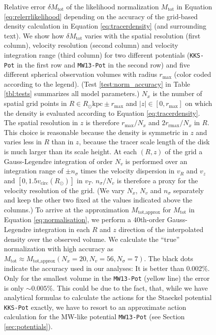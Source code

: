 

\begin{figure}
\centering
{}
\caption{Relative error  $\delta M_\text{tot}$ of the likelihood normalization $M_\text{tot}$ in Equation \ref{eq:relerrlikelihood} depending on the accuracy of the grid-based density calculation in Equation \ref{eq:tracerdensity} (and surrounding text). We show how $\delta M_\text{tot}$ varies with the spatial resolution (first column), velocity resolution (second column) and velocity integration range (third column) for two different potentials (\texttt{KKS-Pot} in the first row and \texttt{MW13-Pot} in the second row) and five different spherical observation volumes with radius $r_\text{max}$ (color coded according to the legend). (Test \ref{test:norm_accuracy} in Table \ref{tbl:tests} summarizes all model parameters.) $N_x$ is the number of spatial grid points in $R \in R_\odot \text{kpc} \pm r_\text{max}$ and $|z| \in [0,r_\text{max}]$ on which the density is evaluated according to Equation \ref{eq:tracerdensity}. The spatial resolution in $z$ is therefore $r_\text{max}/N_x$ and $2r_\text{rmax}/N_x$ in $R$. This choice is reasonable because the density is symmetric in $z$ and varies less in $R$ than in $z$, because the tracer scale length of the disk is much larger than its scale height. At each $(R,z)$ of the grid a Gauss-Legendre integration of order $N_v$ is performed over an integration range of $\pm n_\sigma$ times the velocity dispersion in $v_R$ and $v_z$ and $[0,1.5v_\text{circ}(R_\odot)]$ in $v_T$. $n_\sigma/N_v$ is therefore a proxy for the velocity resolution of the grid. (We vary $N_x$, $N_v$ and $n_\sigma$ separately and keep the other two fixed at the values indicated above the columns.) To arrive at the approximation $M_\text{tot,approx}$ for $M_\text{tot}$ in Equation \ref{eq:normalisation}, we perform a 40th-order Gauss-Legendre integration in each $R$ and $z$ direction of the interpolated density over the observed volume. We calculate the ``true'' normalization with high accuracy as $M_\text{tot} \approx M_\text{tot,approx}(N_x=20,N_v=56,N_\sigma=7)$. The black dots indicate the accuracy used in our analyses: It is better than $0.002\%$. Only for the smallest volume in the \texttt{MW13-Pot} (yellow line) the error is only $\sim 0.005\%$. This could be due to the fact, that, while we have analytical formulas to calculate the actions for the Staeckel potential \texttt{KKS-Pot} exactly, we have to resort to an approximate action calculation for the MW-like potential \texttt{MW13-Pot} (see Section \ref{sec:potentials}). }
\end{figure}


